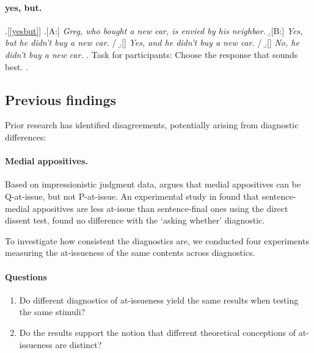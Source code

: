 \documentclass[12pt]{article}
\begin{document}
    \paragraph{yes, but.}
    
      \ex.[\ref{yesbut}]%
        \a.[A:] \emph{Greg, who bought a new car, is envied by his neighbor.}
        \b.[B:] \emph{Yes, but he didn't buy a new car.} /
        \b.[] \emph{Yes, and he didn't buy a new car.} /
        \b.[] \emph{No, he didn't buy a new car.}
        \z.
        Task for participants: Choose the response that sounds best.
      \z.
    

\subsection{Previous findings}

  

    Prior research has identified disagreements, potentially arising from diagnostic differences:

    \paragraph{Medial appositives.} Based on impressionistic judgment data, \citealt{koev_notions_2018} argues that medial appositives can be Q-at-issue, but not P-at-issue. An experimental study in \citealt{syrett_experimental_2015} found that sentence-medial appositives are less at-issue than sentence-final ones using the direct dissent test, \citealt{drozdov_projection_2024} found no difference with the `asking whether' diagnostic.

    To investigate how consistent the diagnostics are, we conducted four experiments measuring the at-issueness of the same contents across diagnostics.

  \paragraph{Questions} %
    \begin{enumerate}
      \item Do different diagnostics of at-issueness yield the same results when testing the same stimuli?
      \item Do the results support the notion that different theoretical conceptions of at-issueness are distinct?
    \end{enumerate}
\end{document}
